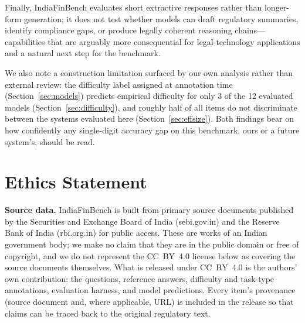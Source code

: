 Finally, IndiaFinBench evaluates short extractive responses rather than longer-form generation; it
does not test whether models can draft regulatory summaries, identify compliance gaps, or produce
legally coherent reasoning chains---capabilities that are arguably more consequential for
legal-technology applications and a natural next step for the benchmark.

We also note a construction limitation surfaced by our own analysis rather than external review: the
difficulty label assigned at annotation time (Section~\ref{sec:models}) predicts empirical
difficulty for only 3 of the 12 evaluated models (Section~\ref{sec:difficulty}), and roughly half of
all items do not discriminate between the systems evaluated here (Section~\ref{sec:effsize}). Both
findings bear on how confidently any single-digit accuracy gap on this benchmark, ours or a future
system's, should be read.

\section*{Ethics Statement}
\label{sec:humansubjects}

\textbf{Source data.} IndiaFinBench is built from primary source documents published by the
Securities and Exchange Board of India (sebi.gov.in) and the Reserve Bank of India (rbi.org.in) for
public access. These are works of an Indian government body; we make no claim that they are in the
public domain or free of copyright, and we do not represent the CC~BY~4.0 license below as covering
the source documents themselves. What is released under CC~BY~4.0 is the authors' own contribution:
the questions, reference answers, difficulty and task-type annotations, evaluation harness, and
model predictions. Every item's provenance (source document and, where applicable, URL) is included
in the release so that claims can be traced back to the original regulatory text.

